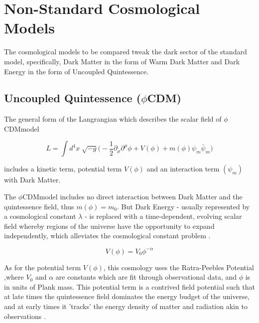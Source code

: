 \documentclass[a4paper,fleqn,usenatbib]{mnras}
\def \qcdm{$\phi$CDM}
\begin{document}
\section{Non-Standard Cosmological Models}
The cosmological models to be compared tweak the dark sector of the standard model, specifically, Dark Matter in the form of Warm Dark Matter and Dark Energy in the form of Uncoupled Quintessence. 

\subsection{Uncoupled Quintessence  (\qcdm)}
The general form of the Langrangian which describes the scalar field of \qcdm model
\begin{ceqn}
\begin{equation}
L=\int d^{4}x\sqrt[]{-g}\big(-\frac{1}{2}\partial_{\mu}\partial^{\mu}\phi+V(\phi)+m(\phi)\psi_{m}\bar{\psi}_{m}\big)
\end{equation}
\end{ceqn}
includes a kinetic term, potential term $V(\phi)$ and an interaction term $(\psi_{m})$ with Dark Matter.

The \qcdm model includes no direct interaction between Dark Matter and the quintessence field, thus $m(\phi)=m_{0}$. But Dark Energy - usually represented by a cosmological constant $\lambda$ - is replaced with a time-dependent, evolving scalar field whereby regions of the universe have the opportunity to expand independently, which alleviates the cosmological constant problem \citep{Joyce_15}.
\begin{ceqn}
\begin{equation}
V(\phi)=V_{0}\phi^{-\alpha}\label{rp}
\end{equation}
\end{ceqn}
As for the potential term $V(\phi)$, this cosmology uses the Ratra-Peebles Potential  \citep{Ratra_88},where $V_{0}$ and $\alpha$ are constants which are fit through observational data, and $\phi$ is in units of Plank mass. This potential term is a contrived field potential such that at late times the quintessence field dominates the energy budget of the universe, and at early times it 'tracks' the energy density of matter and radiation akin to observations \citep{Joyce_15}.
\end{document}
